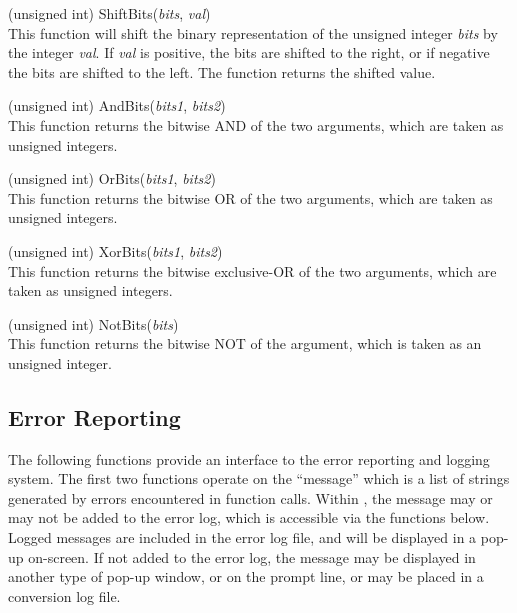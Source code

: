 \begin{description}
\item{(unsigned int) \vt ShiftBits({\it bits\/}, {\it val\/})}\\
This function will shift the binary representation of the unsigned
integer {\it bits} by the integer {\it val\/}.  If {\it val} is
positive, the bits are shifted to the right, or if negative the bits
are shifted to the left.  The function returns the shifted value.

\item{(unsigned int) \vt AndBits({\it bits1\/}, {\it bits2\/})}\\
This function returns the bitwise AND of the two arguments, which are
taken as unsigned integers.

\item{(unsigned int) \vt OrBits({\it bits1\/}, {\it bits2\/})}\\
This function returns the bitwise OR of the two arguments, which are
taken as unsigned integers.

\item{(unsigned int) \vt XorBits({\it bits1\/}, {\it bits2\/})}\\
This function returns the bitwise exclusive-OR of the two arguments,
which are taken as unsigned integers.

\item{(unsigned int) \vt NotBits({\it bits\/})}\\
This function returns the bitwise NOT of the argument, which is taken
as an unsigned integer.

\end{description}


\subsection{Error Reporting}

The following functions provide an interface to the {\Xic} error
reporting and logging system.  The first two functions operate on the
``message'' which is a list of strings generated by errors encountered
in function calls.  Within {\Xic}, the message may or may not be added
to the error log, which is accessible via the functions below.  Logged
messages are included in the error log file, and will be displayed in
a pop-up on-screen.  If not added to the error log, the message may be
displayed in another type of pop-up window, or on the prompt line, or
may be placed in a conversion log file.

